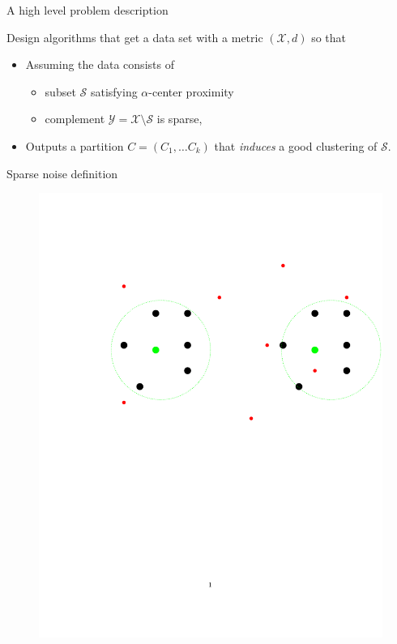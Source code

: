 \documentclass{beamer}
\newcommand{\mc}{\mathcal}
\begin{document}
\begin{frame}{A high level problem description}

	Design algorithms that get a data set with a metric $(\mc X, d)$ so that
	\vspace{1cm}
	\begin{itemize}
		\item Assuming the data consists of 
		\begin{itemize}
		\vspace{0.5cm}
		\item subset $\mc S$ satisfying $\alpha$-center proximity 
		\vspace{0.5cm}
		\item complement $\mc Y= \mc X \setminus \mc S$ is sparse,
		\end{itemize}

		\vspace{1.5cm}
		\item Outputs a partition $C=(C_1, \ldots C_k)$ that \emph{induces} a good clustering of $\mc S$.
	\end{itemize}
\end{frame}

\begin{frame}{Sparse noise definition}
    \begin{figure}
	  \includegraphics[trim = 100 0 0 100, clip, width=0.8\linewidth]{figures/alphacpnoise.pdf}
   \end{figure}

\end{frame}
\end{document}
